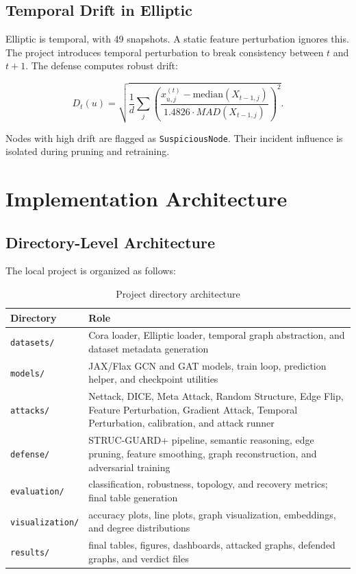 \documentclass[12pt,oneside]{report}
\begin{document}
\section{Temporal Drift in Elliptic}
Elliptic is temporal, with 49 snapshots. A static feature perturbation ignores this. The project introduces temporal perturbation to break consistency between $t$ and $t+1$. The defense computes robust drift:

$$
D_t(u)=\sqrt{\frac{1}{d}\sum_j\left(\frac{x_{u,j}^{(t)}-\text{median}(X_{t-1,j})}{1.4826\cdot MAD(X_{t-1,j})}\right)^2}.
$$

Nodes with high drift are flagged as \texttt{SuspiciousNode}. Their incident influence is isolated during pruning and retraining.

\chapter{Implementation Architecture}

\section{Directory-Level Architecture}
The local project is organized as follows:

\begin{longtable}{p{1.5in}p{4.5in}}
\caption{Project directory architecture}\\
\toprule
\textbf{Directory} & \textbf{Role}\\
\midrule
\texttt{datasets/} & Cora loader, Elliptic loader, temporal graph abstraction, and dataset metadata generation\\
\texttt{models/} & JAX/Flax GCN and GAT models, train loop, prediction helper, and checkpoint utilities\\
\texttt{attacks/} & Nettack, DICE, Meta Attack, Random Structure, Edge Flip, Feature Perturbation, Gradient Attack, Temporal Perturbation, calibration, and attack runner\\
\texttt{defense/} & STRUC-GUARD+ pipeline, semantic reasoning, edge pruning, feature smoothing, graph reconstruction, and adversarial training\\
\texttt{evaluation/} & classification, robustness, topology, and recovery metrics; final table generation\\
\texttt{visualization/} & accuracy plots, line plots, graph visualization, embeddings, and degree distributions\\
\texttt{results/} & final tables, figures, dashboards, attacked graphs, defended graphs, and verdict files\\
\bottomrule
\end{longtable}
\end{document}
